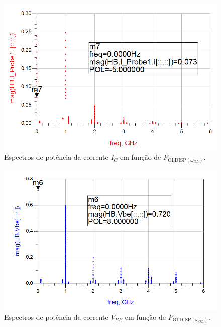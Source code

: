 \documentclass[11pt]{article}
\numberwithin{equation}{section}
\begin{document}
\begin{figure}[h]
\centering
\includegraphics[keepaspectratio=true, scale=0.45]{exps/ID}
\vspace{-0.5em}
\caption{Espectros de potência da corrente $I_{C}$ em função de $ P_{\text{OLDISP}\left(\omega_{OL}\right)} $.}
\vspace{-0.8em}
\label{fig:ID}
\end{figure}

\begin{figure}[h]
\centering
\includegraphics[keepaspectratio=true, scale=0.45]{exps/Vbe}
\vspace{-0.5em}
\caption{Espectros de potência da corrente $V_{BE}$ em função de $ P_{\text{OLDISP}\left(\omega_{OL}\right)} $.}
\vspace{-0.8em}
\label{fig:Vbe}
\end{figure}
\end{document}
